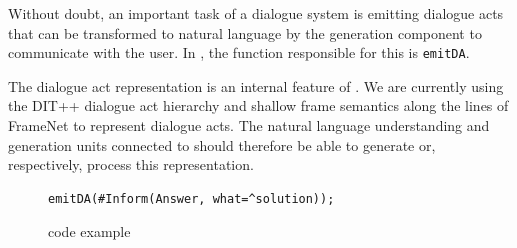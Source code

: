 Without doubt, an important task of a dialogue system is emitting dialogue acts that can be transformed to natural language by the generation component to communicate with the user. In \vonda, the function responsible for this is \texttt{emitDA}.

The dialogue act representation is an internal feature of \vonda. We are currently using the DIT++ dialogue act hierarchy \citep{bunt2012iso} and shallow frame semantics along the lines of FrameNet \citep{ruppenhofer2016framenet} to represent dialogue acts. The natural language understanding and generation units connected to \vonda should therefore be able to generate or, respectively, process this representation.

\begin{figure}[htb]
  \centering\small%
\begin{verbatim}
emitDA(#Inform(Answer, what=^solution));
\end{verbatim}\vspace*{-3ex}
  \caption{\vonda code example}
  \label{fig:DA}
\end{figure}



